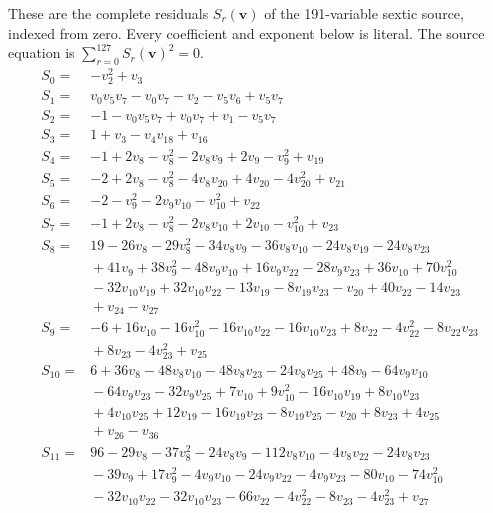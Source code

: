\documentclass[11pt]{article}
\begin{document}
These are the complete residuals $S_r(\boldsymbol v)$ of the
191-variable sextic source, indexed from zero. Every coefficient
and exponent below is literal. The source equation is
$\sum_{r=0}^{127}S_r(\boldsymbol v)^2=0$.
\begingroup\small\setlength{\jot}{3pt}
\begin{align*}
S_{0}={}&-v_{2}^{2}+v_{3}\\
S_{1}={}&v_{0}v_{5}v_{7}-v_{0}v_{7}-v_{2}-v_{5}v_{6}+v_{5}v_{7}\\
S_{2}={}&-1-v_{0}v_{5}v_{7}+v_{0}v_{7}+v_{1}-v_{5}v_{7}\\
S_{3}={}&1+v_{3}-v_{4}v_{18}+v_{16}\\
S_{4}={}&-1+2v_{8}-v_{8}^{2}-2v_{8}v_{9}+2v_{9}-v_{9}^{2}+v_{19}\\
S_{5}={}&-2+2v_{8}-v_{8}^{2}-4v_{8}v_{20}+4v_{20}-4v_{20}^{2}+v_{21}\\
S_{6}={}&-2-v_{9}^{2}-2v_{9}v_{10}-v_{10}^{2}+v_{22}\\
S_{7}={}&-1+2v_{8}-v_{8}^{2}-2v_{8}v_{10}+2v_{10}-v_{10}^{2}+v_{23}\\
S_{8}={}&19-26v_{8}-29v_{8}^{2}-34v_{8}v_{9}-36v_{8}v_{10}-24v_{8}v_{19}-24v_{8}v_{23}\\
&{}+41v_{9}+38v_{9}^{2}-48v_{9}v_{10}+16v_{9}v_{22}-28v_{9}v_{23}+36v_{10}+70v_{10}^{2}\\
&{}-32v_{10}v_{19}+32v_{10}v_{22}-13v_{19}-8v_{19}v_{23}-v_{20}+40v_{22}-14v_{23}\\
&{}+v_{24}-v_{27}\\
S_{9}={}&-6+16v_{10}-16v_{10}^{2}-16v_{10}v_{22}-16v_{10}v_{23}+8v_{22}-4v_{22}^{2}-8v_{22}v_{23}\\
&{}+8v_{23}-4v_{23}^{2}+v_{25}\\
S_{10}={}&6+36v_{8}-48v_{8}v_{10}-48v_{8}v_{23}-24v_{8}v_{25}+48v_{9}-64v_{9}v_{10}\\
&{}-64v_{9}v_{23}-32v_{9}v_{25}+7v_{10}+9v_{10}^{2}-16v_{10}v_{19}+8v_{10}v_{23}\\
&{}+4v_{10}v_{25}+12v_{19}-16v_{19}v_{23}-8v_{19}v_{25}-v_{20}+8v_{23}+4v_{25}\\
&{}+v_{26}-v_{36}\\
S_{11}={}&96-29v_{8}-37v_{8}^{2}-24v_{8}v_{9}-112v_{8}v_{10}-4v_{8}v_{22}-24v_{8}v_{23}\\
&{}-39v_{9}+17v_{9}^{2}-4v_{9}v_{10}-24v_{9}v_{22}-4v_{9}v_{23}-80v_{10}-74v_{10}^{2}\\
&{}-32v_{10}v_{22}-32v_{10}v_{23}-66v_{22}-4v_{22}^{2}-8v_{23}-4v_{23}^{2}+v_{27}\\

\end{align*}
\end{document}
